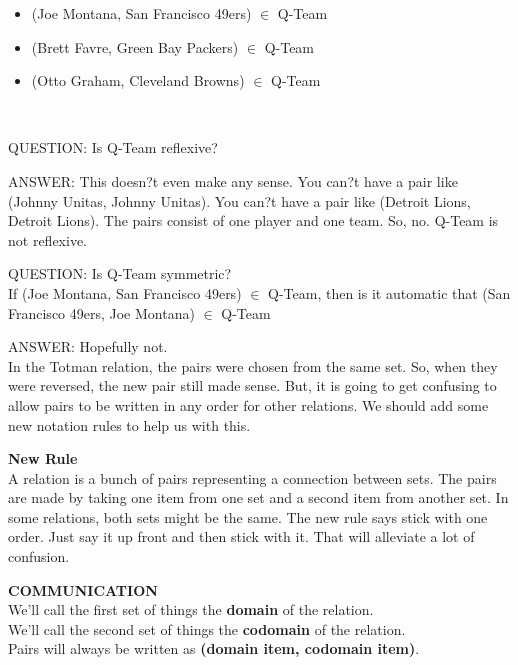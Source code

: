 \documentclass{ximera}
\begin{document}
\begin{example}
\begin{itemize}
 \item (Joe Montana, San Francisco 49ers) $\in$ Q-Team
 \item (Brett Favre, Green Bay Packers) $\in$ Q-Team
 \item (Otto Graham, Cleveland Browns) $\in$ Q-Team
\end{itemize}
\end{example}

\quad \\


\begin{dialogue}
\item[QUESTION:] Is Q-Team reflexive? \\
\item[ANSWER:] This doesn?t even make any sense.  You can?t have a pair like (Johnny Unitas, Johnny Unitas). You can?t have a pair like (Detroit Lions, Detroit Lions).  The pairs consist of one player and one team. So, no. Q-Team is not reflexive.
\end{dialogue}


\begin{dialogue}
\item[QUESTION:] Is Q-Team symmetric?\\
If (Joe Montana, San Francisco 49ers) $\in$ Q-Team, then is it automatic that (San Francisco 49ers, Joe Montana) $\in$ Q-Team\\
\item[ANSWER:] Hopefully not. \\
In the Totman relation, the pairs were chosen from the same set.  So, when they were reversed, the new pair still made sense.  But, it is going to get confusing to allow pairs to be written in any order for other relations. We should add some new notation rules to help us with this.
\end{dialogue}



\textbf{New Rule} \\
A relation is a bunch of pairs representing a connection between sets.  The pairs are made by taking one item from one set and a second item from another set. In some relations, both sets might be the same.  The new rule says stick with one order.  Just say it up front and then stick with it.  That will alleviate a lot of confusion.



\begin{remark} \textbf{COMMUNICATION} \\
We'll call the first set of things the \textbf{domain} of the relation. \\
We'll call the second set of things the \textbf{codomain} of the relation.  \\
Pairs will always be written as \textbf{(domain item, codomain item)}.
\end{remark}
\end{document}
